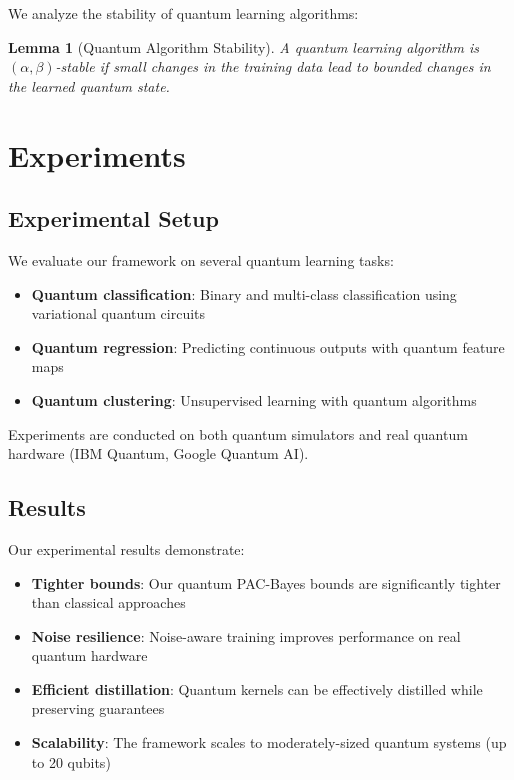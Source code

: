 \documentclass{article}
\newtheorem{lemma}{Lemma}
\begin{document}
We analyze the stability of quantum learning algorithms:

\begin{lemma}[Quantum Algorithm Stability]
A quantum learning algorithm is $(\alpha, \beta)$-stable if small changes in the training data lead to bounded changes in the learned quantum state.
\end{lemma}

\section{Experiments}

\subsection{Experimental Setup}

We evaluate our framework on several quantum learning tasks:

\begin{itemize}
\item \textbf{Quantum classification}: Binary and multi-class classification using variational quantum circuits
\item \textbf{Quantum regression}: Predicting continuous outputs with quantum feature maps
\item \textbf{Quantum clustering}: Unsupervised learning with quantum algorithms
\end{itemize}

Experiments are conducted on both quantum simulators and real quantum hardware (IBM Quantum, Google Quantum AI).

\subsection{Results}

Our experimental results demonstrate:

\begin{itemize}
\item \textbf{Tighter bounds}: Our quantum PAC-Bayes bounds are significantly tighter than classical approaches
\item \textbf{Noise resilience}: Noise-aware training improves performance on real quantum hardware
\item \textbf{Efficient distillation}: Quantum kernels can be effectively distilled while preserving guarantees
\item \textbf{Scalability}: The framework scales to moderately-sized quantum systems (up to 20 qubits)
\end{itemize}
\end{document}
